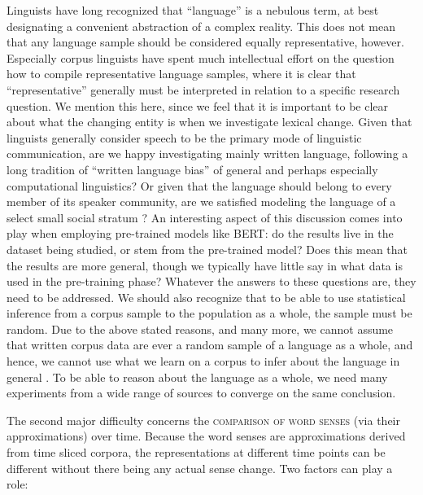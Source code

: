 \documentclass[output=paper]{langsci/langscibook}
\begin{document}
Linguists have long recognized that ``language'' is a nebulous term, at best designating a convenient abstraction of a complex reality. This does not mean that any language sample should be considered equally representative, however. Especially corpus linguists have spent much intellectual effort on the question how to compile representative language samples, where it is clear that ``representative'' generally must be interpreted in relation to a specific research question. We mention this here, since we feel that it is important to be clear about what the changing entity is when we investigate lexical change. Given that linguists generally consider speech to be the primary mode of linguistic communication, are we happy investigating mainly written language, following a long tradition of ``written
language bias'' \citep{linell-2005} of general and perhaps especially computational
linguistics? Or given that the language should belong to every member of its speaker community, are we satisfied modeling the language of a select small social stratum \citep{henrich-etal-2010,sogaard-2016}? 
An interesting aspect of this discussion comes into play when employing pre-trained models like BERT: do the results live in the dataset being studied, or stem from the pre-trained model? Does this mean that the results are more general, though we typically have little say in what data is used in the pre-training phase?
Whatever the answers to these questions are, 
they need to be addressed.
 We should also recognize that to be able to use statistical inference from a corpus sample to the population as a whole, the sample must be random. Due to the above stated reasons, and many more, we cannot assume that written corpus data are ever a random sample of a language as a whole, and hence, we cannot use what we learn on a corpus to infer about the language in general \citep{koplenig2016}. To be able to reason about the language as a whole, we need many experiments from a wide range of sources to converge on the same conclusion. 
 
The second major difficulty concerns the \textsc{comparison of word senses} (via their approximations) over time. Because the word senses are approximations derived from time sliced corpora, the representations at different time points can be different without there being any actual sense change. Two factors can play a role:\largerpage[2]
	
\end{document}
